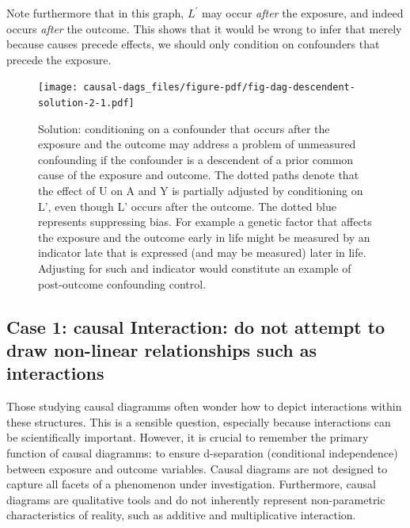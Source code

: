 \documentclass[
  singlecolumn]{report}
\begin{document}
Note furthermore that in this graph, \(L^\prime\) may occur \emph{after}
the exposure, and indeed occurs \emph{after} the outcome. This shows
that it would be wrong to infer that merely because causes precede
effects, we should only condition on confounders that precede the
exposure.

\begin{figure}

{\centering \texttt{[image: causal-dags\_files/figure-pdf/fig-dag-descendent-solution-2-1.pdf]}

}

\caption{\label{fig-dag-descendent-solution-2}Solution: conditioning on
a confounder that occurs after the exposure and the outcome may address
a problem of unmeasured confounding if the confounder is a descendent of
a prior common cause of the exposure and outcome. The dotted paths
denote that the effect of U on A and Y is partially adjusted by
conditioning on L', even though L' occurs after the outcome. The dotted
blue represents suppressing bias. For example a genetic factor that
affects the exposure and the outcome early in life might be measured by
an indicator late that is expressed (and may be measured) later in life.
Adjusting for such and indicator would constitute an example of
post-outcome confounding control.}

\end{figure}

\hypertarget{case-1-causal-interaction-do-not-attempt-to-draw-non-linear-relationships-such-as-interactions}{%
\subsection{Case 1: causal Interaction: do not attempt to draw
non-linear relationships such as
interactions}\label{case-1-causal-interaction-do-not-attempt-to-draw-non-linear-relationships-such-as-interactions}}

Those studying causal diagramms often wonder how to depict interactions
within these structures. This is a sensible question, especially because
interactions can be scientifically important. However, it is crucial to
remember the primary function of causal diagramms: to ensure
d-separation (conditional independence) between exposure and outcome
variables. Causal diagrams are not designed to capture all facets of a
phenomenon under investigation. Furthermore, causal diagrams are
qualitative tools and do not inherently represent non-parametric
characteristics of reality, such as additive and multiplicative
interaction.
\end{document}

